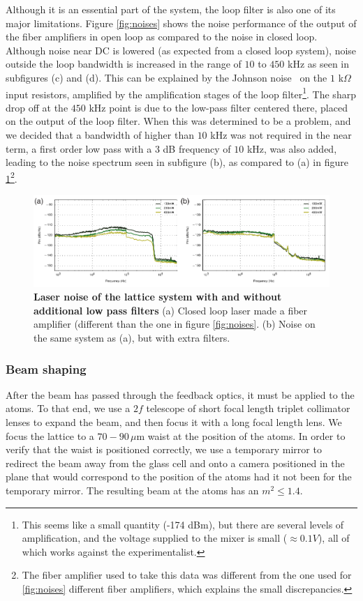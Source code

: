 \documentclass[twocolumn,aps,pra,showpacs,preprintnumbers,bibnotes]{revtex4-1}
\begin{document}
Although it is an essential part of the system, the loop filter is also one of its major limitations. Figure \ref{fig:noises} shows the noise performance of the output of the fiber amplifiers in open loop as compared to the noise in closed loop. Although noise near DC is lowered (as expected from a closed loop system), noise outside the loop bandwidth is increased in the range of $10$ to $450$ kHz as seen in subfigures (c) and (d).
This can be explained by the Johnson noise~\cite{Horowitz2015} on the $1$ k$\Omega$ input resistors, amplified by the amplification stages of the loop filter\footnote{This seems like a small quantity (-174 dBm), but there are several levels of amplification, and the voltage supplied to the mixer is small ($\approx 0.1 V$), all of which works against the experimentalist.}. 
The sharp drop off at the $450$ kHz point is due to the low-pass filter centered there, placed on the output of the loop filter.
When this was determined to be a problem, and we decided that a bandwidth of higher than $10$ kHz was not required in the near term, a first order low pass with a $3$ dB frequency of $10$ kHz, was also added, leading to the noise spectrum seen in subfigure (b), as compared to (a) in figure \ref{fig:low_pass_noises}\footnote{The fiber amplifier used to take this data was different from the one used for \ref{fig:noises} different fiber amplifiers, which explains the small discrepancies.}. 

\begin{figure}
  \begin{center}
    \includegraphics{fig/low_pass_filters.pdf}
    \caption{\textbf{Laser noise of the lattice system with and without additional low pass filters} (a) Closed loop laser made a fiber amplifier (different than the one in figure \ref{fig:noises}. (b) Noise on the same system as (a), but with extra filters.}\label{fig:low_pass_noises}
  \end{center}
\end{figure}


\subsubsection{Beam shaping}
After the beam has passed through the feedback optics, it must be applied to the atoms. To that end, we use a $2f$ telescope of short focal length triplet collimator lenses to expand the beam, and then focus it with a long focal length lens.
We focus the lattice to a $70-90$\,$\mu$m waist at the position of the atoms.
In order to verify that the waist is positioned correctly, we use a temporary mirror to redirect the beam away from the glass cell and onto a camera positioned in the plane that would correspond to the position of the atoms had it not been for the temporary mirror.
The resulting beam at the atoms has an $m^2\leq1.4$.
\end{document}
